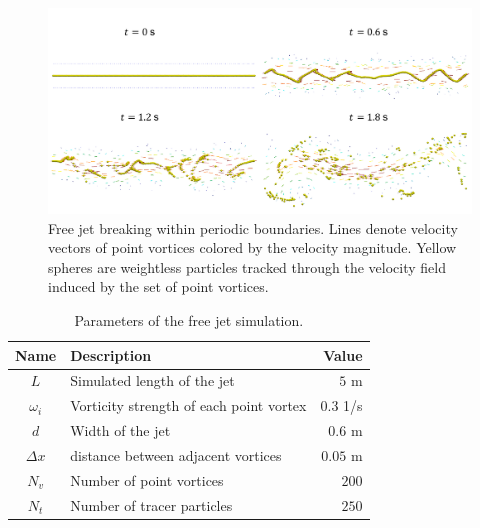 \documentclass[a4paper,12pt,openany]{book}
\theoremstyle{break}
\begin{document}
\begin{figure}[H]
  \includegraphics[scale=0.6]{shear_result.pdf}
  \centering
  \caption{Free jet breaking within periodic boundaries. Lines denote velocity vectors of point vortices colored by the velocity magnitude. Yellow spheres are weightless particles tracked through the velocity field induced by the set of point vortices. }
  \label{fig:shear_result}
\end{figure}\vspace*{3pt}

\begin{table} [H]
\begin{center}
\caption{Parameters of the free jet simulation.}\label{tbl:shear_layer_values}
\begin{tabular}{ c l r } 
\toprule[1.5pt]
\bf Name & \bf Description & \bf Value \\
\midrule
$L$ & Simulated length of the jet & $5$ m \\
$\omega_i$ & Vorticity strength of each point vortex & $0.3$ 1/s \\
$d$ & Width of the jet & $0.6$ m \\
$\Delta x$ & distance between adjacent vortices & $0.05$ m \\
$N_v$ & Number of point vortices & $200$ \\
$N_t$ & Number of tracer particles & $250$ \\
\bottomrule[1.25pt]
\end{tabular}
\end{center}
\end{table}
\end{document}
